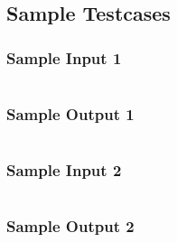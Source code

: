 \subsection{Sample Testcases}

\begin{multicols}{2}
\subsubsection{Sample Input 1}\label{sample-input-1}
\begin{verbatim}
\end{verbatim}

\columnbreak

\subsubsection{Sample Output 1}\label{sample-output-1}
\begin{verbatim}
\end{verbatim}
\end{multicols}

\begin{multicols}{2}
\subsubsection{Sample Input 2}\label{sample-input-2}
\begin{verbatim}
\end{verbatim}

\columnbreak

\subsubsection{Sample Output 2}\label{sample-output-2}
\begin{verbatim}
\end{verbatim}
\end{multicols}



